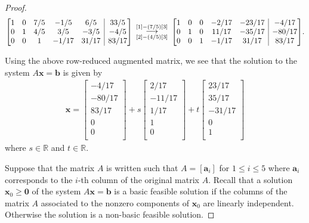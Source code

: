 \documentclass[12pt]{article}
\makeatletter
\theoremstyle{definition}
\newcommand{\vect}[1]{\boldsymbol{#1}}
\newenvironment{amatrix}[1]{%
  \left[\begin{array}{@{}*{#1}{c}|c@{}}
}{%
  \end{array}\right]
}
\newcommand{\grstep}[2][\relax]{%
   \ensuremath{\mathrel{
       {\mathop{\longrightarrow}\limits^{#2\mathstrut}_{
                                     \begin{subarray}{l} #1 \end{subarray}}}}}}
\makeatother
\begin{document}
\begin{proof}
\begin{align*}
\begin{amatrix}{5}
      1 & 0 & 7/5 & -1/5 & 6/5 & 33/5 \\
      0 & 1 & 4/5 & 3/5 & -3/5 & -4/5 \\
      0 & 0 & 1 & -1/17 & 31/17 & 83/17 \\
    \end{amatrix}
    \begin{array}{c}
      \grstep[{[2] - (4/5)[3]}]{[1] - (7/5)[3]} \\
    \end{array}
    \begin{amatrix}{5}
      1 & 0 & 0 & -2/17 & -23/17 & -4/17 \\
      0 & 1 & 0 & 11/17 & -35/17 & -80/17 \\
      0 & 0 & 1 & -1/17 & 31/17 & 83/17 \\
    \end{amatrix}.
  \end{align*}

  Using the above row-reduced augmented matrix, we see that the solution to the
  system $A\vect{x} = \vect{b}$ is given by
  \begin{align}\label{prob_2_x}
    \vect{x} =
    \begin{bmatrix}
      -4/17 \\
      -80/17 \\
      83/17 \\
      0 \\
      0 \\
    \end{bmatrix}
    +
    s
    \begin{bmatrix}
      2/17 \\
      -11/17 \\
      1/17 \\
      1 \\
      0 \\
    \end{bmatrix}
    +
    t
    \begin{bmatrix}
      23/17 \\
      35/17 \\
      -31/17 \\
      0 \\
      1 \\
    \end{bmatrix}
  \end{align}
  where $s\in\mathbb{R}$ and $t\in\mathbb{R}$.

  Suppose that the matrix $A$ is written such that $A = [\vect{a}_i]$ for
  $1 \leq i \leq 5$ where $\vect{a}_i$ corresponds to the $i$-th column of the original
  matrix $A$. Recall that a solution $\vect{x}_0 \geq \vect{0}$ of the system $A\vect{x} = \vect{b}$ is a
  basic feasible solution if the columns of the matrix
  $A$ associated to the nonzero components of $\vect{x}_0$ are linearly
  independent. Otherwise the solution is a non-basic feasible solution.


\end{proof}
\end{document}

